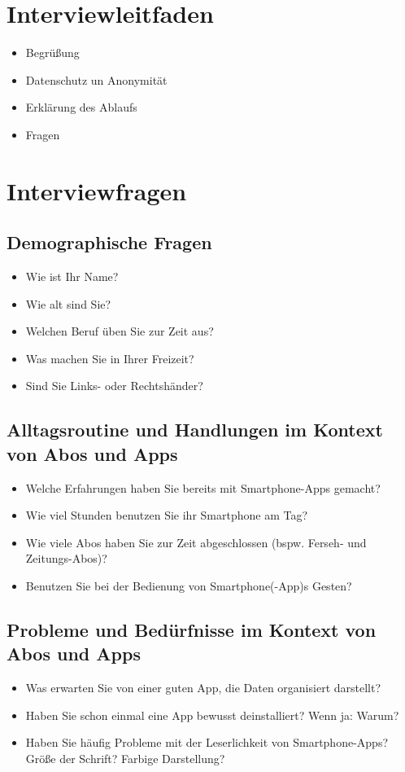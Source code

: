 \documentclass{scrartcl}
\begin{document}
\clearpage
\section{Interviewleitfaden}

\begin{itemize}
\item Begrüßung
\item Datenschutz un Anonymität
\item Erklärung des Ablaufs
\item Fragen
\end{itemize}

\section{Interviewfragen}
\subsection{Demographische Fragen}
\begin{itemize}
\item Wie ist Ihr Name?
\item Wie alt sind Sie?
\item Welchen Beruf üben Sie zur Zeit aus?
\item Was machen Sie in Ihrer Freizeit?
\item Sind Sie Links- oder Rechtshänder?
\end{itemize}
\subsection{Alltagsroutine und Handlungen im Kontext von Abos und Apps}
\begin{itemize}
\item Welche Erfahrungen haben Sie bereits mit Smartphone-Apps gemacht?
\item Wie viel Stunden benutzen Sie ihr Smartphone am Tag?
\item Wie viele Abos haben Sie zur Zeit abgeschlossen (bspw. Ferseh- und Zeitungs-Abos)?
\item Benutzen Sie bei der Bedienung von Smartphone(-App)s Gesten?
\end{itemize}
\subsection{Probleme und Bedürfnisse im Kontext von Abos und Apps}
\begin{itemize}
\item Was erwarten Sie von einer guten App, die Daten organisiert darstellt?
\item Haben Sie schon einmal eine App bewusst deinstalliert? Wenn ja: Warum?
\item Haben Sie häufig Probleme mit der Leserlichkeit von Smartphone-Apps? Größe der Schrift? Farbige Darstellung?
\end{itemize}
\end{document}
